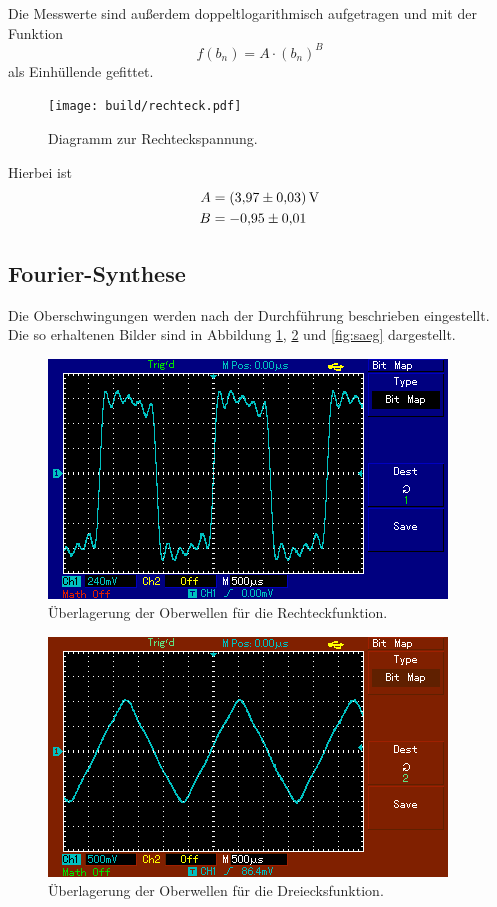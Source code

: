\noindent
Die Messwerte sind außerdem doppeltlogarithmisch aufgetragen und mit der Funktion
\begin{equation}
    f(b_n) = A\cdot(b_n)^B
\end{equation}
als Einhüllende gefittet.
\begin{figure}[H]
    \centering
    \caption{Diagramm zur Rechteckspannung.}
    \texttt{[image: build/rechteck.pdf]}
\end{figure}
Hierbei ist
\begin{align}
    A &= \SI{3.97\pm0.03}{\volt}\\
    B &= \num{-0.95\pm0.01}
\end{align}
%
\subsection{Fourier-Synthese}
Die Oberschwingungen werden nach der Durchführung beschrieben eingestellt.
Die so erhaltenen Bilder sind in Abbildung \ref{fig:eck}, \ref{fig:drei} und \ref{fig:saeg} dargestellt.
\begin{figure}[H]
    \centering
    \caption{Überlagerung der Oberwellen für die Rechteckfunktion.}
    \label{fig:eck}
    \includegraphics{content/MAP001.png}
\end{figure}
\begin{figure}[H]
    \centering
    \caption{Überlagerung der Oberwellen für die Dreiecksfunktion.}
    \label{fig:drei}
    \includegraphics{content/MAP002.png}
\end{figure}
